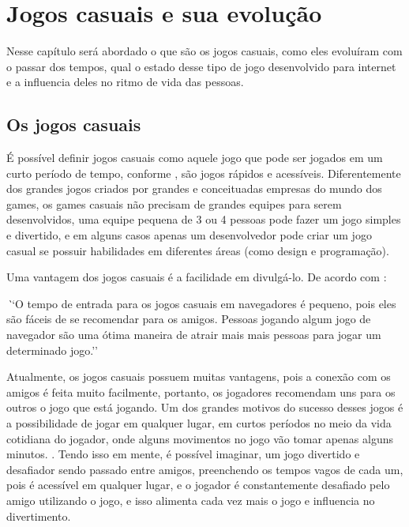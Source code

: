 \section{Jogos casuais e sua evolução}

Nesse capítulo será abordado o que são os jogos casuais, como eles
evoluíram com o passar dos tempos, qual o estado desse tipo de jogo
desenvolvido para internet e a influencia deles no ritmo de vida das
pessoas.

\subsection{Os jogos casuais}

É possível definir jogos casuais como aquele jogo que pode ser jogados em um curto período
de tempo, conforme , são jogos rápidos e acessíveis.
Diferentemente dos grandes jogos criados por grandes e conceituadas
empresas do mundo dos games, os games casuais não precisam de grandes
equipes para serem desenvolvidos, uma equipe pequena de 3 ou 4 pessoas
pode fazer um jogo simples e divertido, e em alguns casos apenas um
desenvolvedor pode criar um jogo casual se possuir habilidades em
diferentes áreas (como design e programação).

Uma vantagem dos jogos casuais é a facilidade em divulgá-lo. De acordo com
:

\begin{singlespacing}
\begin{citacao}{4cm}{0cm}\footnotesize \emph
    ``O tempo de entrada para os jogos casuais em navegadores é pequeno,
    pois eles são fáceis de se recomendar para os amigos. Pessoas jogando
    algum jogo de navegador são uma ótima maneira de atrair mais mais
    pessoas para jogar um determinado jogo.''
\end{citacao}
\end{singlespacing}

Atualmente, os jogos casuais possuem muitas vantagens, pois a conexão
com os amigos é feita muito facilmente, portanto, os jogadores
recomendam uns para os outros o jogo que está jogando.
Um dos grandes motivos do sucesso desses jogos é a possibilidade de
jogar em qualquer lugar, em curtos períodos no meio da vida cotidiana
do jogador, onde alguns movimentos no jogo vão tomar apenas alguns
minutos. \cite{ozcan2010recent}.
Tendo isso em mente, é possível imaginar, um jogo divertido e desafiador
sendo passado entre amigos, preenchendo os tempos vagos de cada um,
pois é acessível em qualquer lugar, e o jogador é constantemente
desafiado pelo amigo utilizando o jogo, e isso alimenta cada vez mais
o jogo e influencia no divertimento.

